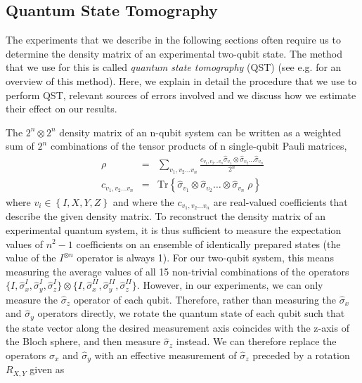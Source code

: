 \subsection{Quantum State Tomography}

The experiments that we describe in the following sections often require us to determine the density matrix of an experimental two-qubit state. The method that we use for this is called {\it quantum state tomography} (QST) (see e.g. \cite{nielsen_quantum_2000} for an overview of this method). Here, we explain in detail the procedure that we use to perform QST, relevant sources of errors involved and we discuss how we estimate their effect on our results.

\smallskip

The $2^n\otimes 2^n$ density matrix of an n-qubit system can be written as a weighted sum of $2^n$ combinations of the tensor products of n single-qubit Pauli matrices,
%
\begin{eqnarray}
\rho & = & \sum\limits_{v_1,v_2\hdots v_n} \frac{c_{v_1,v_2\hdots v_n} \hat{\sigma}_{v_1}\otimes \hat{\sigma}_{v_2}\hdots \hat{\sigma}_{v_n}}{2^n} \label{eq:state_tomography_state_representation} \\
c_{v_1,v_2\hdots v_n} & = & \mathrm{Tr}\left\{\hat{\sigma}_{v_1}\otimes \hat{\sigma}_{v_2}\hdots \otimes\hat{\sigma}_{v_n} \; \rho \right\} \label{eq:state_tomography_coefficients}
\end{eqnarray}
%
where $v_i \in \left\{I,X,Y,Z\right\}$ and where the $c_{v_1,v_2\hdots v_n}$ are real-valued coefficients that describe the given density matrix. To reconstruct the density matrix of an experimental quantum system, it is thus sufficient to measure the expectation values of $n^2-1$ coefficients on an ensemble of identically prepared states (the value of the $I^{\otimes n}$ operator is always 1). For our two-qubit system, this means measuring the average values of all 15 non-trivial combinations of the operators $\{I,\hat{\sigma}_x^I,\hat{\sigma}_y^I,\hat{\sigma}_z^I\}\otimes\{I,\hat{\sigma}_x^{II},\hat{\sigma}_y^{II},\hat{\sigma}_z^{II}\}$. However, in our experiments, we can only measure the $\hat{\sigma}_z$ operator of each qubit. Therefore, rather than measuring the $\hat{\sigma}_x$ and $\hat{\sigma}_y$ operators directly, we rotate the quantum state of each qubit such that the state vector along the desired measurement axis coincides with the z-axis of the Bloch sphere, and then measure $\hat{\sigma}_z$ instead. We can therefore replace the operators $\hat{\sigma}_x$ and $\hat{\sigma}_y$ with an effective measurement of $\hat{\sigma}_z$ preceded by a rotation $R_{X,Y}$ given as
